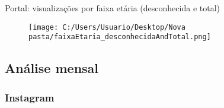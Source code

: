 \documentclass{article}%
\begin{document}
%
\newpage%
\section*{}%
\label{sec:}%
Portal: visualizações por faixa etária (desconhecida e total)%


\begin{figure}[H]%
\centering%
\texttt{[image: C:/Users/Usuario/Desktop/Nova pasta/faixaEtaria\_desconhecidaAndTotal.png]}%
\end{figure}

%
\newpage%
\subsection*{Análise mensal}%
\label{subsec:Anlisemensal}%
\subsubsection*{Instagram}%
\label{ssubsec:Instagram}%
\end{document}
